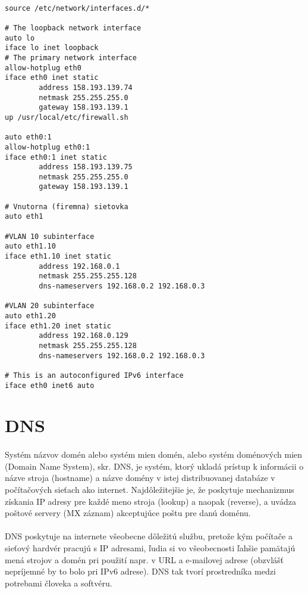 \noindent
{\selectfont

\begin{small}

\begin{verbatim}

source /etc/network/interfaces.d/*

# The loopback network interface
auto lo
iface lo inet loopback
# The primary network interface
allow-hotplug eth0
iface eth0 inet static
        address 158.193.139.74
        netmask 255.255.255.0
        gateway 158.193.139.1
up /usr/local/etc/firewall.sh

auto eth0:1
allow-hotplug eth0:1
iface eth0:1 inet static
        address 158.193.139.75
        netmask 255.255.255.0
        gateway 158.193.139.1

# Vnutorna (firemna) sietovka
auto eth1

#VLAN 10 subinterface
auto eth1.10
iface eth1.10 inet static
        address 192.168.0.1
        netmask 255.255.255.128
        dns-nameservers 192.168.0.2 192.168.0.3

#VLAN 20 subinterface
auto eth1.20
iface eth1.20 inet static
        address 192.168.0.129
        netmask 255.255.255.128
        dns-nameservers 192.168.0.2 192.168.0.3

# This is an autoconfigured IPv6 interface
iface eth0 inet6 auto

\end{verbatim}
\end{small}
}



\section{DNS}
\paragraph{}
Systém názvov domén alebo systém mien domén, alebo systém doménových mien (Domain Name System), skr. DNS, je systém, ktorý ukladá prístup k informácii o názve stroja (hostname) a názve domény v istej distribuovanej databáze v počítačo\-vých sieťach ako internet. Najdôležitejšie je, že poskytuje mechanizmus získania IP adresy pre každé meno stroja (lookup) a naopak (reverse), a uvádza poštové servery (MX záznam) akceptujúce poštu pre danú doménu.
\paragraph{}
DNS poskytuje na internete všeobecne dôležitú službu, pretože kým počítače a sieťový hardvér pracujú s IP adresami, ľudia si vo všeobecnosti ľahšie pamätajú mená strojov a domén pri použití napr. v URL a e-mailovej adrese (obzvlášť nepríjem\-né by to bolo pri IPv6 adrese). DNS tak tvorí prostredníka medzi potrebami človeka a softvéru.
